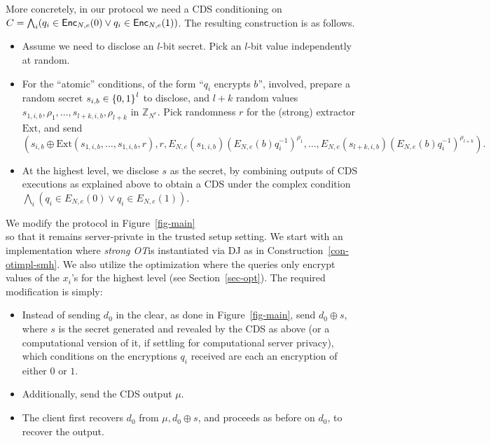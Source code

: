 \documentclass[11pt]{article}
\newcommand{\enc}{{\sf Enc}}
\newcommand{\Z}{\mathbb{Z}}
\newcommand\ot{\mbox{OT}\xspace}
\newcommand\strongot{{\em strong \ot\xspace}}
\newcommand{\mathify}[1]{\ifmmode{#1}\else\mbox{$#1$}\fi}
\newcommand{\set}[2][]{\mathify{{\left\{#2\right\}}^{#1}}}
\begin{document}
More concretely, in our protocol we need a CDS conditioning on $C=\bigwedge_i(q_i\in \enc_{N,e}(0)\vee q_i\in \enc_{N,e}(1))$. The resulting construction is as follows.
\begin{itemize}
\item Assume we need to disclose an $l$-bit secret. Pick an $l$-bit value independently at random.
\item For the ``atomic'' conditions, of the form ``$q_i$ encrypts $b$'', involved, prepare a random secret
$s_{i,b}\in\set{0,1}^l$ to disclose, and $l+k$ random values $s_{1,i,b},\rho_1,\ldots,s_{l+k,i,b},\rho_{l+k}$ in $\Z_{N^e}$. Pick
randomness $r$ for the (strong) extractor $\text{Ext}$, and send \[(s_{i,b}\oplus \text{Ext}(s_{1,i,b},\ldots,s_{1,i,b},r),r,E_{N,e}(s_{1,i,b})(E_{N,e}(b)q^{-1}_i)^{\rho_1},\ldots,E_{N,e}(s_{l+k,i,b})(E_{N,e}(b)q^{-1}_i)^{\rho_{l+k}}).\]
\item At the highest level, we disclose $s$ as the secret, by combining outputs of CDS executions as explained above
to obtain a CDS under the complex condition $\bigwedge_i(q_i\in E_{N,e}(0)\vee q_i\in E_{N,e}(1))$.
\end{itemize}
We modify the protocol in Figure~\ref{fig-main}\\ 
so that it remains server-private in the trusted setup setting. We start with an implementation
where \strongot is instantiated via DJ as in Construction~\ref{con-otimpl-smh}. We also utilize the optimization where the queries only encrypt values of the $x_i$'s for the highest level (see
Section~\ref{sec-opt}). The required modification is simply:
\begin{itemize}
\item Instead of sending $d_0$ in the clear, as done in Figure~\ref{fig-main}, send $d_0\oplus s$, where $s$ is the secret generated and revealed by the CDS as
above (or a computational version of it, if settling for computational server privacy), which conditions on the encryptions $q_i$ received are each an encryption of either $0$ or $1$.
\item Additionally, send the CDS output $\mu$.
\item The client first recovers $d_0$ from $\mu,d_0\oplus s$, and proceeds as before on $d_0$, to recover the output.
\end{itemize}
\end{document}
